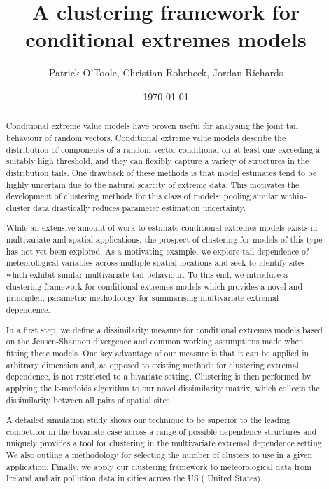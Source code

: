 \documentclass{article}
\title{A clustering framework for conditional extremes models}
\author{Patrick O'Toole, Christian Rohrbeck, Jordan Richards}
\date{\today}
\numberwithin{equation}{section}
\begin{document}
\maketitle


\begin{abstract}
 Conditional extreme value models have proven useful for analysing the joint tail behaviour of random vectors. 
 Conditional extreme value models describe the distribution of components of a random vector conditional on at least one exceeding a suitably high threshold, and they can flexibly capture a variety of structures in the distribution tails.
 One drawback of these methods is that model estimates tend to be highly uncertain due to the natural scarcity of extreme data. 
 This motivates the development of clustering methods for this class of models; pooling similar within-cluster data drastically reduces parameter estimation uncertainty.
 
 While an extensive amount of work to estimate conditional extremes models exists in multivariate and spatial applications, the prospect of clustering for models of this type has not yet been explored. 
 As a motivating example, we explore tail dependence of meteorological variables across multiple spatial locations and seek to identify sites which exhibit similar multivariate tail behaviour. 
 To this end, we introduce a clustering framework for conditional extremes models which provides a novel and principled, parametric methodology for summarising multivariate extremal dependence.
 
 In a first step, we define a dissimilarity measure for conditional extremes models based on the Jensen-Shannon divergence and common working assumptions made when fitting these models. 
 One key advantage of our measure is that it can be applied in arbitrary dimension and, as opposed to existing methods for clustering extremal dependence, is not restricted to a bivariate setting. 
 Clustering is then performed by applying the k-medoids algorithm to our novel dissimilarity matrix, which collects the dissimilarity between all pairs of spatial sites. 
 
 A detailed simulation study shows our technique to be superior to the leading competitor in the bivariate case across a range of possible dependence structures and uniquely provides a tool for clustering in the multivariate extremal dependence setting. 
 We also outline a methodology for selecting the number of clusters to use in a given application.  Finally, we apply our clustering framework to meteorological data from Ireland and air pollution data in cities across the US ( United States). 

\end{abstract}
\end{document}
